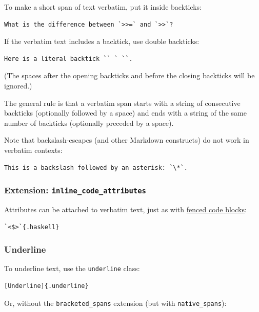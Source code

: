 \documentclass[
]{article}
\begin{document}
To make a short span of text verbatim, put it inside backticks:

\begin{verbatim}
What is the difference between `>>=` and `>>`?
\end{verbatim}

If the verbatim text includes a backtick, use double backticks:

\begin{verbatim}
Here is a literal backtick `` ` ``.
\end{verbatim}

(The spaces after the opening backticks and before the closing backticks
will be ignored.)

The general rule is that a verbatim span starts with a string of
consecutive backticks (optionally followed by a space) and ends with a
string of the same number of backticks (optionally preceded by a space).

Note that backslash-escapes (and other Markdown constructs) do not work
in verbatim contexts:

\begin{verbatim}
This is a backslash followed by an asterisk: `\*`.
\end{verbatim}

\hypertarget{extension-inline_code_attributes}{%
\subsubsection{\texorpdfstring{Extension:
\texttt{inline\_code\_attributes}}{Extension: inline\_code\_attributes}}\label{extension-inline_code_attributes}}

Attributes can be attached to verbatim text, just as with
\protect\hyperlink{fenced-code-blocks}{fenced code blocks}:

\begin{verbatim}
`<$>`{.haskell}
\end{verbatim}

\hypertarget{underline}{%
\subsubsection{Underline}\label{underline}}

To underline text, use the \texttt{underline} class:

\begin{verbatim}
[Underline]{.underline}
\end{verbatim}

Or, without the \texttt{bracketed\_spans} extension (but with
\texttt{native\_spans}):
\end{document}

